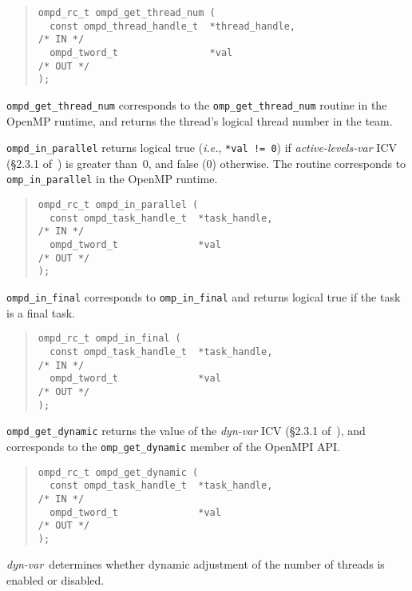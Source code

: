 \begin{quote}
\begin{lstlisting}
ompd_rc_t ompd_get_thread_num (
  const ompd_thread_handle_t  *thread_handle,                       /* IN */
  ompd_tword_t                *val                                 /* OUT */
);
\end{lstlisting}
\end{quote}
\verb|ompd_get_thread_num| corresponds to the \verb|omp_get_thread_num|
routine in the OpenMP runtime, and returns the thread's logical
thread number in the team.
 
\verb|ompd_in_parallel| returns logical true (\textit{i.e.}, \texttt{*val != 0})
if \emph{active-levels-var}
ICV (\S2.3.1 of~\cite{OpenMP}) is greater than~0, and false (0) otherwise.
The routine corresponds to \verb|omp_in_parallel| in the OpenMP runtime.
\begin{quote}
\begin{lstlisting}
ompd_rc_t ompd_in_parallel (
  const ompd_task_handle_t  *task_handle,                           /* IN */
  ompd_tword_t              *val                                   /* OUT */
); 
\end{lstlisting}
\end{quote}

\verb|ompd_in_final| corresponds to \verb|omp_in_final| and returns
logical true if the task is a final task.
\begin{quote}
\begin{lstlisting}
ompd_rc_t ompd_in_final (
  const ompd_task_handle_t  *task_handle,                           /* IN */
  ompd_tword_t              *val                                   /* OUT */
); 
\end{lstlisting}
\end{quote}

\verb|ompd_get_dynamic| returns the value of the
\emph{dyn-var} ICV (\S2.3.1 of~\cite{OpenMP}),
and corresponds to the \verb|omp_get_dynamic| member of the OpenMPI API.
\begin{quote}
\begin{lstlisting}
ompd_rc_t ompd_get_dynamic (
  const ompd_task_handle_t  *task_handle,                           /* IN */
  ompd_tword_t              *val                                   /* OUT */
);
\end{lstlisting}
\end{quote}
\emph{dyn-var}~determines whether dynamic adjustment of the number
of threads is enabled or disabled.


